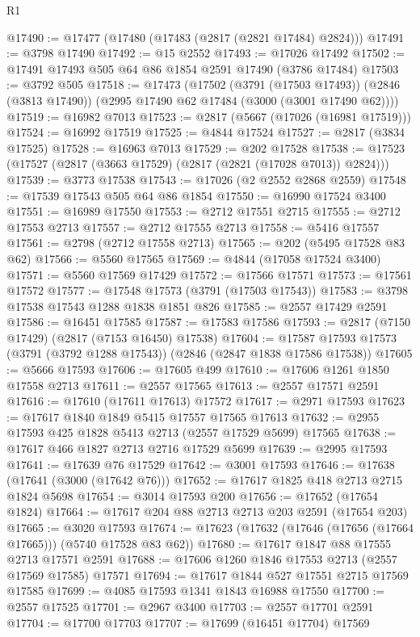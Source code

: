 \begin{lexlean}{R1}
\begin{coremodule}
@17490 := @17477 (@17480 (@17483 (@2817 (@2821 @17484) @2824)))
@17491 := @3798 @17490
@17492 := @15 @2552
@17493 := @17026 @17492
@17502 := @17491 @17493 @505 @64 @86 @1854 @2591 @17490 (@3786 @17484)
@17503 := @3792 @505
@17518 := @17473
    (@17502
      (@3791 (@17503 @17493))
      (@2846 (@3813 @17490))
      (@2995 @17490 @62 @17484 (@3000 (@3001 @17490 @62))))
@17519 := @16982 @7013
@17523 := @2817 (@5667 (@17026 (@16981 @17519)))
@17524 := @16992 @17519
@17525 := @4844 @17524
@17527 := @2817 (@3834 @17525)
@17528 := @16963 @7013
@17529 := @202 @17528
@17538 := @17523 (@17527 (@2817 (@3663 @17529) (@2817 (@2821 (@17028 @7013)) @2824)))
@17539 := @3773 @17538
@17543 := @17026 (@2 @2552 @2868 @2559)
@17548 := @17539 @17543 @505 @64 @86 @1854
@17550 := @16990 @17524 @3400
@17551 := @16989 @17550
@17553 := @2712 @17551 @2715
@17555 := @2712 @17553 @2713
@17557 := @2712 @17555 @2713
@17558 := @5416 @17557
@17561 := @2798 (@2712 @17558 @2713)
@17565 := @202 (@5495 @17528 @83 @62)
@17566 := @5560 @17565
@17569 := @4844 (@17058 @17524 @3400)
@17571 := @5560 @17569 @17429
@17572 := @17566 @17571
@17573 := @17561 @17572
@17577 := @17548 @17573 (@3791 (@17503 @17543))
@17583 := @3798 @17538 @17543 @1288 @1838 @1851 @826
@17585 := @2557 @17429 @2591
@17586 := @16451 @17585
@17587 := @17583 @17586
@17593 := @2817 (@7150 @17429) (@2817 (@7153 @16450) @17538)
@17604 := @17587 @17593 @17573 (@3791 (@3792 @1288 @17543)) (@2846 (@2847 @1838 @17586 @17538))
@17605 := @5666 @17593
@17606 := @17605 @499
@17610 := @17606 @1261 @1850 @17558 @2713
@17611 := @2557 @17565
@17613 := @2557 @17571 @2591
@17616 := @17610 (@17611 @17613) @17572
@17617 := @2971 @17593
@17623 := @17617 @1840 @1849 @5415 @17557 @17565 @17613
@17632 := @2955 @17593 @425 @1828 @5413 @2713 (@2557 @17529 @5699) @17565
@17638 := @17617 @466 @1827 @2713 @2716 @17529 @5699
@17639 := @2995 @17593
@17641 := @17639 @76 @17529
@17642 := @3001 @17593
@17646 := @17638 (@17641 (@3000 (@17642 @76)))
@17652 := @17617 @1825 @418 @2713 @2715 @1824 @5698
@17654 := @3014 @17593 @200
@17656 := @17652 (@17654 @1824)
@17664 := @17617 @204 @88 @2713 @2713 @203 @2591 (@17654 @203)
@17665 := @3020 @17593
@17674 := @17623 (@17632 (@17646 (@17656 (@17664 @17665))) (@5740 @17528 @83 @62))
@17680 := @17617 @1847 @88 @17555 @2713 @17571 @2591
@17688 := @17606 @1260 @1846 @17553 @2713 (@2557 @17569 @17585) @17571
@17694 := @17617 @1844 @527 @17551 @2715 @17569 @17585
@17699 := @4085 @17593 @1341 @1843 @16988 @17550
@17700 := @2557 @17525
@17701 := @2967 @3400
@17703 := @2557 @17701 @2591
@17704 := @17700 @17703
@17707 := @17699 (@16451 @17704) @17569

\end{coremodule}
\end{lexlean}
